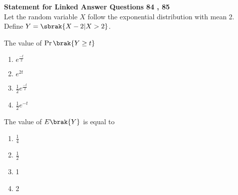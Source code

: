 \textbf{Statement for Linked Answer Questions 84 , 85}\\
Let the random variable $X$ follow the exponential distribution with mean 2. Define
$Y = \sbrak{X - 2 | X > 2}$.
\item[84.] The value of $\Pr{\brak{Y \ge t}}$
		\hfill{}
		\begin{enumerate}
            \item $e ^ {\frac{-t}{2}}$ 
            \item $e ^ {2t}$ 
            \item $\frac{1}{2}e ^ {\frac{-t}{2}}$ 
            \item $\frac{1}{2}e ^ {-t}$ 
		\end{enumerate}
\item[85.] The value of $E\brak{Y}$ is equal to
		\hfill{}
		\begin{enumerate}
            \item $\frac{1}{4}$ 
            \item $\frac{1}{2}$ 
            \item 1
            \item 2
		\end{enumerate}

